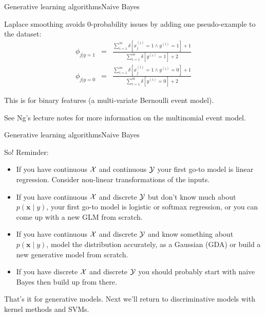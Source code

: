 \documentclass{beamer}
\renewcommand{\vec}[1]{\boldsymbol{#1}}
\begin{document}
\begin{frame}{Generative learning algorithms}{Naive Bayes}

  \alert{Laplace smoothing} avoids 0-probability issues by adding
  one pseudo-example to the dataset:
  \begin{eqnarray}
    \phi_{j|y=1} & = &
    \frac{\sum_{i=1}^m \delta[x_j^{(i)} = 1 \wedge y^{(i)} = 1] + 1}
         {\sum_{i=1}^m \delta[y^{(i)} = 1] + 2} \nonumber \\
    \phi_{j|y=0} & = &
    \frac{\sum_{i=1}^m \delta[x_j^{(i)} = 1 \wedge y^{(i)} = 0] + 1}
         {\sum_{i=1}^m \delta[y^{(i)} = 0] + 2} \nonumber
  \end{eqnarray}

  This is for binary features (a multi-variate Bernoulli event model).

  \medskip

  See Ng's lecture notes for more information on the
  \alert{multinomial event model}.

\end{frame}


\begin{frame}{Generative learning algorithms}{Naive Bayes}

  So! Reminder:
  \begin{itemize}
  \item If you have continuous ${\cal X}$ and continuous ${\cal Y}$
    your first go-to model is \alert{linear regression}. Consider
    non-linear transformations of the inputs.
  \item If you have continuous ${\cal X}$ and discrete ${\cal Y}$ but
    don't know much about $p(\vec{x} \mid y)$, your first go-to model
    is \alert{logistic or softmax regression}, or you can come up with
    a \alert{new GLM} from scratch.
  \item If you have continuous ${\cal X}$ and discrete ${\cal Y}$ and
    know something about $p(\vec{x} \mid y)$, model the distribution
    accurately, as a Gaussian (\alert{GDA}) or build a \alert{new
      generative model} from scratch.
  \item If you have discrete ${\cal X}$ and discrete ${\cal Y}$ you
    should probably start with \alert{naive Bayes} then build up from
    there.
  \end{itemize}

  That's it for generative models. Next we'll return to discriminative
  models with kernel methods and SVMs.
  
\end{frame}
\end{document}
